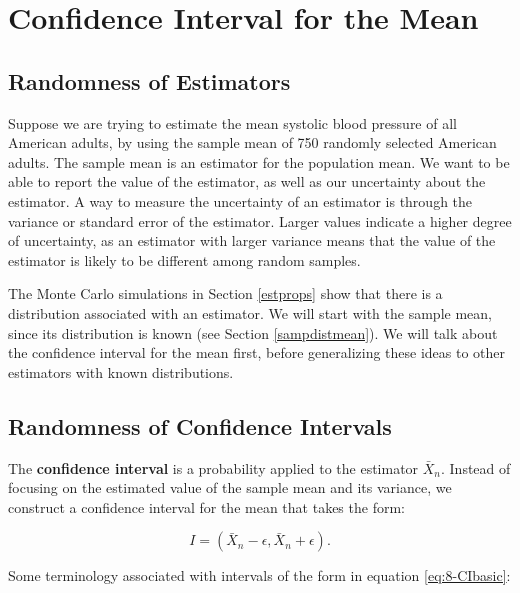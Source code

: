 \documentclass[
]{book}
\begin{document}
\hypertarget{CImean}{%
\section{Confidence Interval for the Mean}\label{CImean}}

\hypertarget{randomness-of-estimators}{%
\subsection{Randomness of Estimators}\label{randomness-of-estimators}}

Suppose we are trying to estimate the mean systolic blood pressure of all American adults, by using the sample mean of 750 randomly selected American adults. The sample mean is an estimator for the population mean. We want to be able to report the value of the estimator, as well as our uncertainty about the estimator. A way to measure the uncertainty of an estimator is through the variance or standard error of the estimator. Larger values indicate a higher degree of uncertainty, as an estimator with larger variance means that the value of the estimator is likely to be different among random samples.

The Monte Carlo simulations in Section \ref{estprops} show that there is a distribution associated with an estimator. We will start with the sample mean, since its distribution is known (see Section \ref{sampdistmean}). We will talk about the confidence interval for the mean first, before generalizing these ideas to other estimators with known distributions.

\hypertarget{randomness-of-confidence-intervals}{%
\subsection{Randomness of Confidence Intervals}\label{randomness-of-confidence-intervals}}

The \textbf{confidence interval} is a probability applied to the estimator \(\bar{X}_n\). Instead of focusing on the estimated value of the sample mean and its variance, we construct a confidence interval for the mean that takes the form:

\begin{equation} 
I = \left(\bar{X}_n - \epsilon, \bar{X}_n + \epsilon \right).
\label{eq:8-CIbasic}
\end{equation}

Some terminology associated with intervals of the form in equation \eqref{eq:8-CIbasic}:
\end{document}
